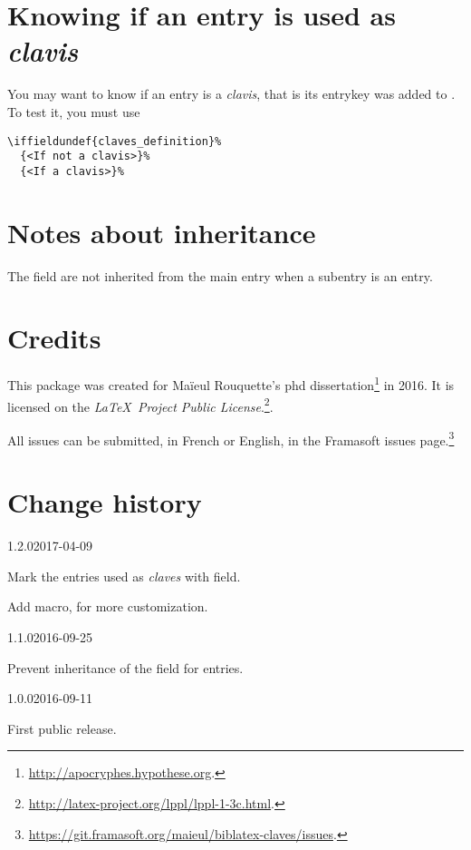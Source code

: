 \documentclass{ltxdockit}[2011/03/25]
\begin{document}
\section{Knowing if an entry is used as \emph{clavis}}

You may want to know if an entry is a \emph{clavis}, that is its entrykey was added to . To test it, you must use

\begin{verbatim}
\iffieldundef{claves_definition}%
  {<If not a clavis>}%
  {<If a clavis>}%
\end{verbatim}

\section{Notes about inheritance}

The  field are not inherited from the main entry when a subentry is an  entry.
\section{Credits}

This package was created for Maïeul Rouquette's phd dissertation\footnote{\url{http://apocryphes.hypothese.org}.} in 2016. 
It is licensed on the \emph{\LaTeX\ Project Public License}.\footnote{\url{http://latex-project.org/lppl/lppl-1-3c.html}.}.


All issues can be submitted, in French or English, in the Framasoft issues page.\footnote{\url{https://git.framasoft.org/maieul/biblatex-claves/issues}.}


\section{Change history}

\begin{changelog}

\begin{release}{1.2.0}{2017-04-09}
\item Mark the entries used as \emph{claves} with  field.
\item Add  macro, for more customization.
\end{release}

\begin{release}{1.1.0}{2016-09-25}
\item Prevent inheritance of the  field for  entries.
\end{release}

\begin{release}{1.0.0}{2016-09-11}
\item First public release.
\end{release}

\end{changelog}
\end{document}
